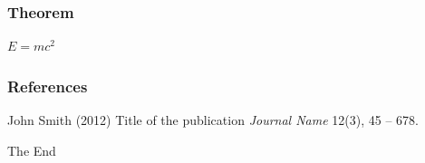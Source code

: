 \documentclass{beamer}
\begin{document}
\begin{frame}
\frametitle{Theorem}
\begin{theorem}
$E = mc^2$
\end{theorem}
\end{frame}


\begin{frame}
\frametitle{References}
\footnotesize{
\begin{thebibliography}{99} %
 John Smith (2012)
\newblock Title of the publication
\newblock \emph{Journal Name} 12(3), 45 -- 678.
\end{thebibliography}
}
\end{frame}


\begin{frame}
\Huge{\centerline{The End}}
\end{frame}
\end{document}

